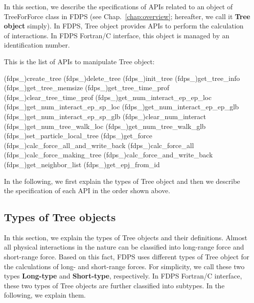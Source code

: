\newcommand{\tlap}[1]{\vbox to 0pt{\vss\hbox{#1}}}
\newcommand{\blap}[1]{\vbox to 0pt{\hbox{#1}\vss}}

In this section, we describe the specifications of APIs related to an object of TreeForForce class in FDPS (see Chap.~\ref{chap:overview}; hereafter, we call it \textbf{Tree object} simply). In FDPS, Tree object provides APIs to perform the calculation of interactions. In FDPS Fortran/C interface, this object is managed by an identification number.

This is the list of APIs to manipulate Tree object:
\begin{screen}
\begin{spverbatim}
(fdps_)create_tree
(fdps_)delete_tree
(fdps_)init_tree
(fdps_)get_tree_info
(fdps_)get_tree_memsize
(fdps_)get_tree_time_prof
(fdps_)clear_tree_time_prof
(fdps_)get_num_interact_ep_ep_loc
(fdps_)get_num_interact_ep_sp_loc
(fdps_)get_num_interact_ep_ep_glb
(fdps_)get_num_interact_ep_sp_glb
(fdps_)clear_num_interact
(fdps_)get_num_tree_walk_loc
(fdps_)get_num_tree_walk_glb
(fdps_)set_particle_local_tree
(fdps_)get_force
(fdps_)calc_force_all_and_write_back
(fdps_)calc_force_all
(fdps_)calc_force_making_tree
(fdps_)calc_force_and_write_back
(fdps_)get_neighbor_list
(fdps_)get_epj_from_id
\end{spverbatim}  
\end{screen}

In the following, we first explain the types of Tree object and then we describe the specification of each API in the order shown above.
\clearpage

\subsection{Types of Tree objects}
In this section, we explain the types of Tree objects and their definitions. Almost all physical interactions in the nature can be classified into long-range force and short-range force. Based on this fact, FDPS uses different types of Tree object for the calculations of long- and short-range forces. For simplicity, we call these two types \textbf{Long-type} and \textbf{Short-type}, respectively. In FDPS Fortran/C interface, these two types of Tree objects are further classified into subtypes. In the following, we explain them.

